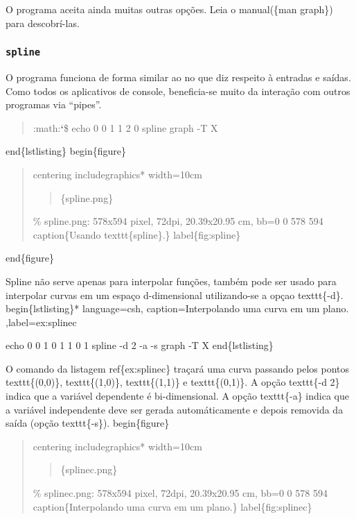 \documentclass[a4paper,10pt,brazil]{sphinxmanual}
\begin{document}
O programa  aceita ainda muitas outras opções. Leia o
manual(\{man graph\}) para descobrí-las.


\subsubsection{\texttt{spline}}
\label{bash:spline}
O programa funciona de forma similar ao  no que diz
respeito à entradas e saídas. Como todos os aplicativos de console,
beneficia-se muito da interação com outros programas via ``pipes''.
\begin{quote}

:math:{\color{red}\bfseries{}{}`}\$ echo 0 0 1 1 2 0 \textbar{} spline \textbar{} graph -T X
\end{quote}

end\{lstlisting\}
begin\{figure\}
\begin{quote}

centering
includegraphics* width=10cm
\begin{quote}

\{spline.png\}
\end{quote}

\% spline.png: 578x594 pixel, 72dpi, 20.39x20.95 cm, bb=0 0 578 594
caption\{Usando texttt\{spline\}.\}
label\{fig:spline\}
\end{quote}

end\{figure\}

Spline não serve apenas para interpolar funções, também pode ser usado para interpolar curvas em um espaço d-dimensional utilizando-se a opçao texttt\{-d\}.
begin\{lstlisting\}* language=csh, caption=Interpolando uma curva em um plano. ,label=ex:splinec

echo 0 0 1 0 1 1 0 1 \textbar{} spline -d 2 -a -s \textbar{} graph -T X
end\{lstlisting\}

O comando da listagem ref\{ex:splinec\} traçará uma curva passando pelos pontos texttt\{(0,0)\}, texttt\{(1,0)\}, texttt\{(1,1)\} e texttt\{(0,1)\}. A opção texttt\{-d 2\} indica que a variável dependente é bi-dimensional. A opção texttt\{-a\} indica que a variável independente deve ser gerada automáticamente e depois removida da saída (opção texttt\{-s\}).
begin\{figure\}
\begin{quote}

centering
includegraphics* width=10cm
\begin{quote}

\{splinec.png\}
\end{quote}

\% splinec.png: 578x594 pixel, 72dpi, 20.39x20.95 cm, bb=0 0 578 594
caption\{Interpolando uma curva em um plano.\}
label\{fig:splinec\}
\end{quote}
\end{document}
